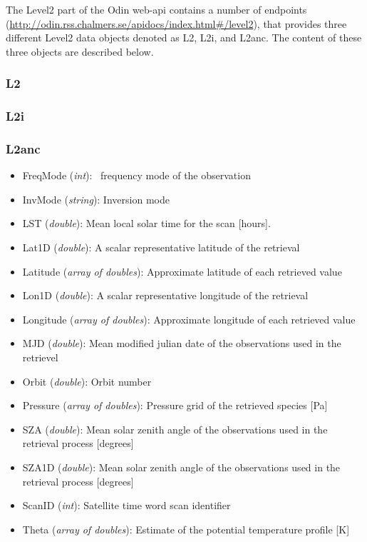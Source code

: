The Level2 part of the Odin web-api contains a number of endpoints
(\url{http://odin.rss.chalmers.se/apidocs/index.html#/level2}),
that provides three different Level2 data objects denoted as
L2, L2i, and L2anc. The content of these three objects are described below.

\subsubsection{L2}

\subsubsection{L2i}

\subsubsection{L2anc}

\begin{itemize}

    \item FreqMode (\emph{int}): \smr\ frequency mode of the observation
    \item InvMode (\emph{string}): Inversion mode
    \item LST (\emph{double}): Mean local solar time for the scan [hours].
    \item Lat1D (\emph{double}): A scalar representative latitude of
      the retrieval
    \item Latitude (\emph{array of doubles}): Approximate latitude of each
      retrieved value
    \item Lon1D (\emph{double}): A scalar representative longitude of
      the retrieval
    \item Longitude (\emph{array of doubles}): Approximate longitude of each
      retrieved value
    \item MJD (\emph{double}): Mean modified julian date of the observations
      used in the retrievel
    \item Orbit (\emph{double}): Orbit number
    \item Pressure (\emph{array of doubles}): Pressure grid of the retrieved
      species [Pa]
    \item SZA  (\emph{double}): Mean solar zenith angle of the observations
      used in the retrieval process [degrees]
    \item SZA1D (\emph{double}): Mean solar zenith angle of the observations
      used in the retrieval process [degrees]
    \item ScanID (\emph{int}): Satellite time word scan identifier
    \item Theta (\emph{array of doubles}): Estimate of the potential temperature
      profile [K]

\end{itemize}
